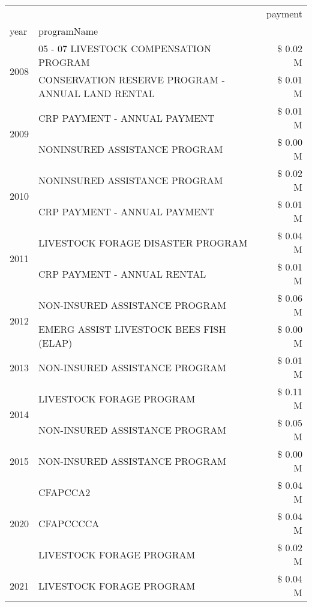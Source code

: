 \begin{tabular}{llr}
\toprule
 &  & payment \\
year & programName &  \\
\midrule
\multirow[t]{2}{*}{2008} & 05 - 07 LIVESTOCK COMPENSATION PROGRAM & \$ 0.02 M \\
 & CONSERVATION RESERVE PROGRAM - ANNUAL LAND RENTAL & \$ 0.01 M \\
\cline{1-3}
\multirow[t]{2}{*}{2009} & CRP PAYMENT - ANNUAL PAYMENT & \$ 0.01 M \\
 & NONINSURED ASSISTANCE PROGRAM & \$ 0.00 M \\
\cline{1-3}
\multirow[t]{2}{*}{2010} & NONINSURED ASSISTANCE PROGRAM & \$ 0.02 M \\
 & CRP PAYMENT - ANNUAL PAYMENT & \$ 0.01 M \\
\cline{1-3}
\multirow[t]{2}{*}{2011} & LIVESTOCK FORAGE DISASTER PROGRAM & \$ 0.04 M \\
 & CRP PAYMENT - ANNUAL RENTAL & \$ 0.01 M \\
\cline{1-3}
\multirow[t]{2}{*}{2012} & NON-INSURED ASSISTANCE PROGRAM & \$ 0.06 M \\
 & EMERG ASSIST LIVESTOCK BEES FISH (ELAP) & \$ 0.00 M \\
\cline{1-3}
2013 & NON-INSURED ASSISTANCE PROGRAM & \$ 0.01 M \\
\cline{1-3}
\multirow[t]{2}{*}{2014} & LIVESTOCK FORAGE PROGRAM & \$ 0.11 M \\
 & NON-INSURED ASSISTANCE PROGRAM & \$ 0.05 M \\
\cline{1-3}
2015 & NON-INSURED ASSISTANCE PROGRAM & \$ 0.00 M \\
\cline{1-3}
\multirow[t]{3}{*}{2020} & CFAPCCA2 & \$ 0.04 M \\
 & CFAPCCCCA & \$ 0.04 M \\
 & LIVESTOCK FORAGE PROGRAM & \$ 0.02 M \\
\cline{1-3}
2021 & LIVESTOCK FORAGE PROGRAM & \$ 0.04 M \\
\cline{1-3}
\bottomrule
\end{tabular}
